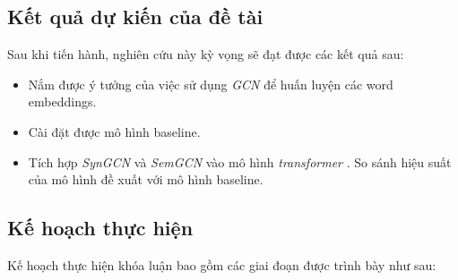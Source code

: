 \documentclass{article}[14pt]
\begin{document}
{    \subsection{Kết quả dự kiến của đề tài}
       
    Sau khi tiến hành, nghiên cứu này kỳ vọng sẽ đạt được các kết quả sau:
    \begin{itemize}
        \item Nắm được ý tưởng của việc sử dụng \textit{GCN} để huấn luyện các word embeddings.
        \item Cài đặt được mô hình baseline.
        \item Tích hợp \textit{SynGCN} và \textit{SemGCN} vào mô hình  \textit{transformer} . So sánh hiệu suất của mô hình đề xuất với mô hình baseline.
    \end{itemize}
    
    \subsection{Kế hoạch thực hiện}
        
    Kế hoạch thực hiện khóa luận bao gồm các giai đoạn được trình bày như sau:

}
\end{document}
